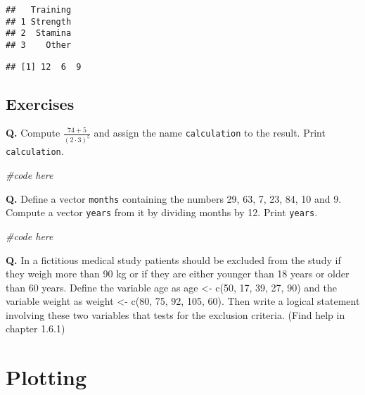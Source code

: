 \documentclass[
]{article}
\newenvironment{Shaded}{\begin{snugshade}}{\end{snugshade}}
\newcommand{\CommentTok}[1]{\textcolor[rgb]{0.56,0.35,0.01}{\textit{#1}}}
\newcommand{\DecValTok}[1]{\textcolor[rgb]{0.00,0.00,0.81}{#1}}
\newcommand{\NormalTok}[1]{#1}
\newcommand{\SpecialCharTok}[1]{\textcolor[rgb]{0.81,0.36,0.00}{\textbf{#1}}}
\begin{document}
\begin{verbatim}
##   Training
## 1 Strength
## 2  Stamina
## 3    Other
\end{verbatim}

\begin{Shaded}
\end{Shaded}

\begin{verbatim}
## [1] 12  6  9
\end{verbatim}

\hypertarget{exercises}{%
\subsection{Exercises}\label{exercises}}

\textbf{Q.} Compute \(\frac{74+5}{(2⋅3)^5}\) and assign the name
\texttt{calculation} to the result. Print \texttt{calculation}.

\begin{Shaded}
\begin{Highlighting}[]
\CommentTok{\#code here}
\end{Highlighting}
\end{Shaded}

\textbf{Q.} Define a vector \texttt{months} containing the numbers 29,
63, 7, 23, 84, 10 and 9. Compute a vector \texttt{years} from it by
dividing months by 12. Print \texttt{years}.

\begin{Shaded}
\begin{Highlighting}[]
\CommentTok{\#code here}
\end{Highlighting}
\end{Shaded}

\textbf{Q.} In a fictitious medical study patients should be excluded
from the study if they weigh more than 90 kg or if they are either
younger than 18 years or older than 60 years. Define the variable age as
age \textless- c(50, 17, 39, 27, 90) and the variable weight as weight
\textless- c(80, 75, 92, 105, 60). Then write a logical statement
involving these two variables that tests for the exclusion criteria.
(Find help in chapter 1.6.1)

\hypertarget{plotting}{%
\section{Plotting}\label{plotting}}
\end{document}
